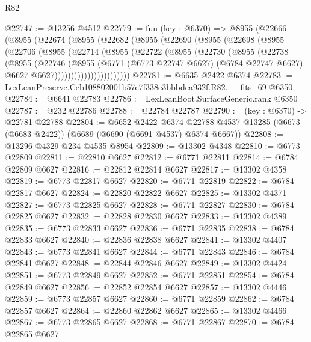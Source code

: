 \begin{lexlean}{R82}
\begin{coremodule}
@22747 := @13256 @4512
@22779 := fun (key : @6370) =>
  @8955
    (@22666
      (@8955
        (@22674
          (@8955
            (@22682
              (@8955
                (@22690
                  (@8955
                    (@22698
                      (@8955
                        (@22706
                          (@8955
                            (@22714
                              (@8955
                                (@22722
                                  (@8955
                                    (@22730
                                      (@8955
                                        (@22738
                                          (@8955
                                            (@22746
                                              (@8955
                                                (@6771
                                                  (@6773 @22747 @6627)
                                                  (@6784 @22747 @6627)
                                                  @6627
                                                  @6627)))))))))))))))))))))))
@22781 := @6635 @2422 @6374
@22783 := LexLeanPreserve.Ceb108802001b57e7f338e3bbbdea932f.R82.__fits_69 @6350
@22784 := @6641 @22783
@22786 := LexLeanBoot.SurfaceGeneric.rank @6350
@22787 := @232 @22786
@22788 := @22784 @22787
@22790 := (key : @6370) -> @22781 @22788
@22804 := @6652
    @2422
    @6374
    @22788
    @4537
    @13285
    (@6673 (@6683 @2422))
    (@6689 (@6690 (@6691 @4537) @6374 @6667))
@22808 := @13296 @4329 @234 @4535 @8954
@22809 := @13302 @4348
@22810 := @6773 @22809
@22811 := @22810 @6627
@22812 := @6771 @22811
@22814 := @6784 @22809 @6627
@22816 := @22812 @22814 @6627
@22817 := @13302 @4358
@22819 := @6773 @22817 @6627
@22820 := @6771 @22819
@22822 := @6784 @22817 @6627
@22824 := @22820 @22822 @6627
@22825 := @13302 @4371
@22827 := @6773 @22825 @6627
@22828 := @6771 @22827
@22830 := @6784 @22825 @6627
@22832 := @22828 @22830 @6627
@22833 := @13302 @4389
@22835 := @6773 @22833 @6627
@22836 := @6771 @22835
@22838 := @6784 @22833 @6627
@22840 := @22836 @22838 @6627
@22841 := @13302 @4407
@22843 := @6773 @22841 @6627
@22844 := @6771 @22843
@22846 := @6784 @22841 @6627
@22848 := @22844 @22846 @6627
@22849 := @13302 @4424
@22851 := @6773 @22849 @6627
@22852 := @6771 @22851
@22854 := @6784 @22849 @6627
@22856 := @22852 @22854 @6627
@22857 := @13302 @4446
@22859 := @6773 @22857 @6627
@22860 := @6771 @22859
@22862 := @6784 @22857 @6627
@22864 := @22860 @22862 @6627
@22865 := @13302 @4466
@22867 := @6773 @22865 @6627
@22868 := @6771 @22867
@22870 := @6784 @22865 @6627

\end{coremodule}
\end{lexlean}

